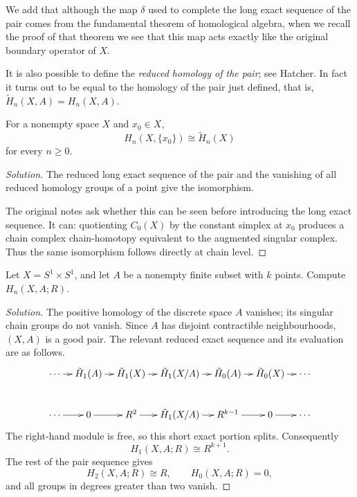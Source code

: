 \begin{remark}
We add that although the map $\delta$ used to
complete the
long exact sequence of the pair comes from
the fundamental
theorem of homological algebra, when we
recall the proof of
that theorem we see that this map acts
exactly like the
original boundary operator of $X$.
\end{remark}

\begin{remark}
It is also possible to define the
\emph{reduced homology of
the pair}; see Hatcher. In fact it turns out
to be equal to
the homology of the pair just defined, that
is,
$\tilde H_n(X,A)=H_n(X,A)$.
\end{remark}

\begin{exercise}
For a nonempty space $X$ and $x_0\in X$,
$$
H_n(X,\{x_0\})\cong\tilde H_n(X)
$$
for every $n\geq0$.
\begin{proof}[Solution]
The reduced long exact sequence of the pair
and the vanishing of all reduced homology
groups of a point give the isomorphism.

The original notes ask whether this can be
seen before introducing the long exact
sequence. It can: quotienting $C_0(X)$ by the
constant simplex at $x_0$ produces a chain
complex chain-homotopy equivalent to the
augmented singular complex. Thus the same
isomorphism follows directly at chain level.
\end{proof}
\end{exercise}


\begin{exercise}
Let $X=S^1\times S^1$, and let $A$ be a
nonempty finite subset with $k$ points.
Compute $H_n(X,A;R)$.
\end{exercise}

\begin{proof}[Solution]
The positive homology of the discrete space
$A$ vanishes; its singular chain groups do
not vanish. Since $A$ has disjoint
contractible
neighbourhoods, $(X,A)$ is a good pair. The
relevant reduced exact sequence and its
evaluation are as follows.
$$
\xymatrix@C=.9em@R=2.5em{
\cdots \ar[r]
 & \tilde H_1(A) \ar[r]
 & \tilde H_1(X) \ar[r]
 & \tilde H_1(X/A) \ar[r]
 & \tilde H_0(A) \ar[r]
 & \tilde H_0(X) \ar[r]
 & \cdots \\
\cdots \ar[r]
 & 0 \ar[r]
 & R^2 \ar[r]
 & \tilde H_1(X/A) \ar[r]
 & R^{k-1} \ar[r]
 & 0 \ar[r]
 & \cdots
}
$$
The right-hand module is free, so this short
exact portion splits. Consequently
$$
H_1(X,A;R)\cong R^{k+1}.
$$
The rest of the pair sequence gives
$$
H_2(X,A;R)\cong R,
\qquad
H_0(X,A;R)=0,
$$
and all groups in degrees greater than two
vanish.
\end{proof}
